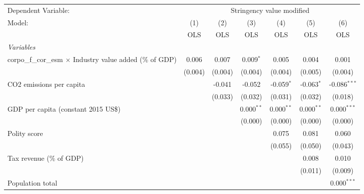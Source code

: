 
\begingroup
\centering
\begin{tabular}{lcccccc}
   \toprule
   Dependent Variable: & \multicolumn{6}{c}{Stringency value modified}\\
   Model:                                                            & (1)     & (2)     & (3)          & (4)          & (5)          & (6)\\  
                                                                     &  OLS    & OLS     & OLS          & OLS          & OLS          & OLS\\  
   \midrule
   \emph{Variables}\\
   corpo\_f\_cor\_esm $\times$ Industry value added (\% of GDP)      & 0.006   & 0.007   & 0.009$^{*}$  & 0.005        & 0.004        & 0.001\\   
                                                                     & (0.004) & (0.004) & (0.004)      & (0.004)      & (0.005)      & (0.004)\\   
   CO2 emissions per capita                                          &         & -0.041  & -0.052       & -0.059$^{*}$ & -0.063$^{*}$ & -0.086$^{***}$\\   
                                                                     &         & (0.033) & (0.032)      & (0.031)      & (0.032)      & (0.018)\\   
   GDP per capita (constant 2015 US\$)                               &         &         & 0.000$^{**}$ & 0.000$^{**}$ & 0.000$^{**}$ & 0.000$^{***}$\\   
                                                                     &         &         & (0.000)      & (0.000)      & (0.000)      & (0.000)\\   
   Polity score                                                      &         &         &              & 0.075        & 0.081        & 0.060\\   
                                                                     &         &         &              & (0.055)      & (0.050)      & (0.043)\\   
   Tax revenue (\% of GDP)                                           &         &         &              &              & 0.008        & 0.010\\   
                                                                     &         &         &              &              & (0.011)      & (0.009)\\   
   Population total                                                  &         &         &              &              &              & 0.000$^{***}$\\   

\end{tabular}
